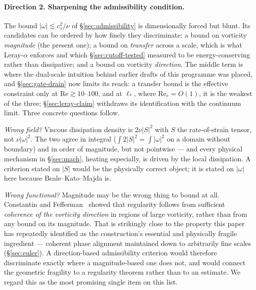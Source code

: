 \documentclass[11pt,a4paper]{article}
\begin{document}
\paragraph{Direction 2. Sharpening the admissibility condition.}
The bound $|\omega|\lesssim c_s^2/\nu$ of \S\ref{sec:admissibility} is dimensionally forced but
blunt. Its candidates can be ordered by how finely they discriminate: a bound on vorticity
\emph{magnitude} (the present one); a bound on \emph{transfer} across a scale, which is what
Leray-$\alpha$ enforces and which \S\ref{sec:cutoff-tested} measured to be energy-conserving rather
than dissipative; and a bound on vorticity \emph{direction}. The middle term is where the
dual-scale intuition behind earlier drafts of this programme was placed, and
\S\ref{sec:gate-drain} now limits its reach: a transfer bound is the effective constraint only at
$\mathrm{Re}\gtrsim10$--$100$, and at $\ell_*$, where $\mathrm{Re}_r=O(1)$, it is the weakest of the
three; \S\ref{sec:leray-claim} withdraws its identification with the continuum limit. Three concrete questions follow.

\emph{Wrong field?} Viscous dissipation density is $2\nu|S|^2$ with $S$ the rate-of-strain tensor,
not $\nu|\omega|^2$. The two agree in integral ($\int2|S|^2=\int|\omega|^2$ on a domain without
boundary) and in order of magnitude, but not pointwise --- and every physical mechanism in
\S\ref{sec:mach}, heating especially, is driven by the local dissipation. A criterion stated on
$|S|$ would be the physically correct object; it is stated on $|\omega|$ here because
Beale--Kato--Majda is.

\emph{Wrong functional?} Magnitude may be the wrong thing to bound at all. Constantin and
Fefferman~\cite{ConstantinFefferman1993} showed that regularity follows from sufficient
\emph{coherence of the vorticity direction} in regions of large vorticity, rather than from any
bound on its magnitude. That is strikingly close to the property this paper has repeatedly
identified as the construction's essential and physically fragile ingredient --- coherent phase
alignment maintained down to arbitrarily fine scales (\S\ref{sec:euler}). A direction-based
admissibility criterion would therefore discriminate exactly where a magnitude-based one does not,
and would connect the geometric fragility to a regularity theorem rather than to an estimate. We
regard this as the most promising single item on this list.
\end{document}
